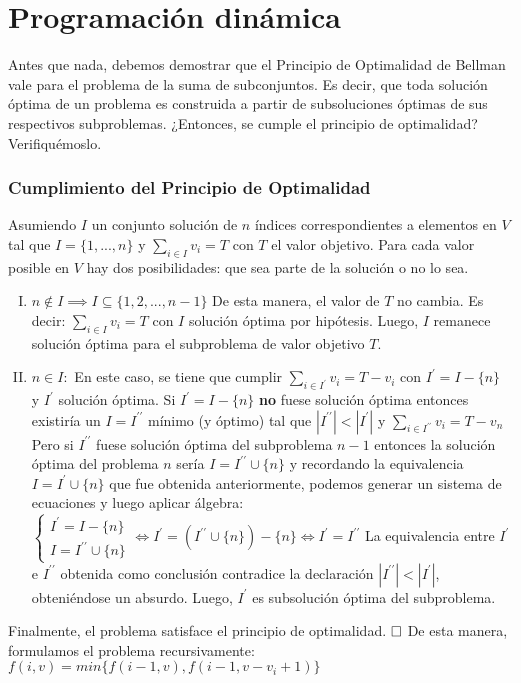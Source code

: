 \section{Programación dinámica}
Antes que nada, debemos demostrar que el Principio de Optimalidad de Bellman vale para el problema de la suma de subconjuntos. Es decir, que toda solución óptima de un problema es construida a partir de subsoluciones óptimas de sus respectivos subproblemas. ¿Entonces, se cumple el principio de optimalidad? Verifiquémoslo.

\subsubsection{Cumplimiento del Principio de Optimalidad}
Asumiendo $I$ un conjunto solución de $n$ índices correspondientes a elementos en $V$ tal que $I=\{1, ..., n\}$ y $\sum_{i \in I}v_{i} = T$ con $T$ el valor objetivo. Para cada valor posible en $V$ hay dos posibilidades: que sea parte de la solución o no lo sea.

\begin{enumerate}[I)]
\item $n \notin I \implies I \subseteq \{1, 2, ..., n-1\}$
	\vskip 0pt
	De esta manera, el valor de $T$ no cambia. Es decir: $\sum_{i \in I}v_{i}=T$ con $I$ solución óptima por hipótesis. Luego, $I$ remanece solución óptima para el subproblema de valor objetivo $T$.
\item $n \in I:$
	\vskip 0pt
	En este caso, se tiene que cumplir $\sum_{i \in I^\prime}v_{i}=T-v_{i}$ con $I^\prime=I-\{n\}$ y $I^\prime$ solución óptima.
	\vskip 8pt
	Si $I^\prime=I-\{n\}$ \textbf{no} fuese solución óptima entonces existiría un $I=I^{\prime\prime}$ mínimo (y óptimo) tal que $|I^{\prime\prime}| < |I^\prime|$ y $\sum_{i \in I^{\prime\prime}}v_{i} = T - v_{n}$
	\vskip 8pt
	Pero si $I^{\prime\prime}$ fuese solución óptima del subproblema $n-1$ entonces la solución óptima del problema $n$ sería $I = I^{\prime\prime} \cup \{n\}$ y recordando la equivalencia $I=I^\prime \cup \{n\}$ que fue obtenida anteriormente, podemos generar un sistema de ecuaciones y luego aplicar álgebra:
	\vskip 8pt
	$
		\begin{cases}
			I^\prime = I - \{n\} \\ 
			I = I^{\prime\prime} \cup \{n\}
		\end{cases}
		\iff
		I^\prime = (I^{\prime\prime} \cup \{n\}) - \{n\} \iff I^\prime = I^{\prime\prime}
	$
	\vskip 8pt
	La equivalencia entre $I^\prime$ e $I^{\prime\prime}$ obtenida como conclusión contradice la declaración $|I^{\prime\prime}| < |I^\prime|$, obteniéndose un absurdo. Luego, $I^\prime$ es subsolución óptima del subproblema.
\end{enumerate}
Finalmente, el problema satisface el principio de optimalidad.
\vskip 8pt
$\qedwhite$
\vskip 8pt
De esta manera, formulamos el problema recursivamente:
\vskip 8pt
$f(i, v) = min\{f(i - 1, v), f(i - 1, v - v_{i} + 1)\}$

